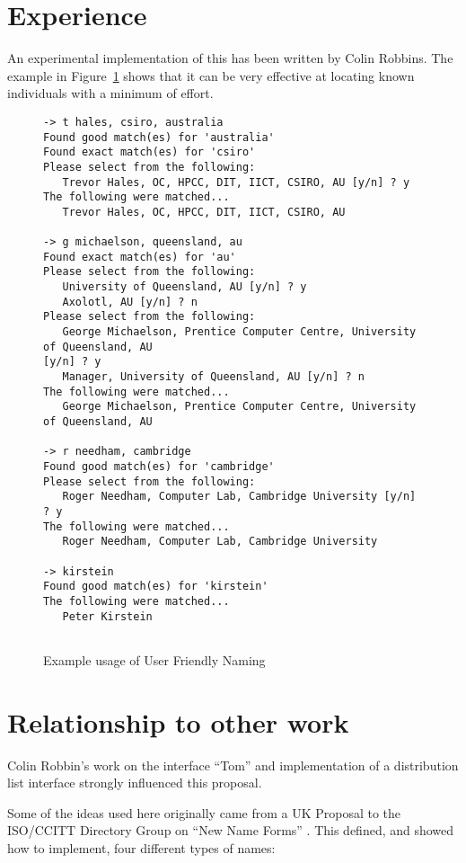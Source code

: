 \section {Experience}

An experimental implementation of this has been written by Colin Robbins.
The example in Figure~\ref{usage} shows that it can be very effective at
locating known individuals with a minimum of effort.

\begin{figure}
\begin{small}
\begin{verbatim}
-> t hales, csiro, australia
Found good match(es) for 'australia'
Found exact match(es) for 'csiro'
Please select from the following:
   Trevor Hales, OC, HPCC, DIT, IICT, CSIRO, AU [y/n] ? y
The following were matched...
   Trevor Hales, OC, HPCC, DIT, IICT, CSIRO, AU

-> g michaelson, queensland, au
Found exact match(es) for 'au'
Please select from the following:
   University of Queensland, AU [y/n] ? y
   Axolotl, AU [y/n] ? n
Please select from the following:
   George Michaelson, Prentice Computer Centre, University of Queensland, AU
[y/n] ? y
   Manager, University of Queensland, AU [y/n] ? n
The following were matched...
   George Michaelson, Prentice Computer Centre, University of Queensland, AU

-> r needham, cambridge
Found good match(es) for 'cambridge'
Please select from the following:
   Roger Needham, Computer Lab, Cambridge University [y/n] ? y
The following were matched...
   Roger Needham, Computer Lab, Cambridge University

-> kirstein
Found good match(es) for 'kirstein'
The following were matched...
   Peter Kirstein


\end{verbatim}
\end{small}
\caption {Example usage of User Friendly Naming}
\label{usage}
\end{figure}


\section {Relationship to other work}

Colin Robbin's work on the interface ``Tom'' and implementation of a
distribution list interface strongly influenced this proposal.

Some of the ideas used here originally came from a UK Proposal to the
ISO/CCITT Directory Group on ``New Name Forms'' \cite{NNF}.  This defined,
and showed how to implement, four different types of names:

